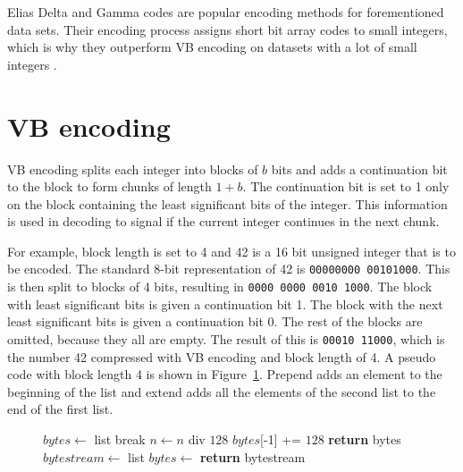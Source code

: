 Elias Delta and Gamma codes \citep{Eli75} are popular encoding methods for forementioned data sets. Their encoding process assigns short bit array codes to small integers, 
which is why they outperform VB encoding on datasets with a lot of small integers .

\section{VB encoding}
VB encoding splits each integer into blocks of $b$ bits and adds a continuation bit to the block to form chunks of length $1+b$. The continuation bit is set to 1 only
on the block containing the least significant bits of the integer. This information is used in decoding to signal if the current integer continues in the next chunk. 

For example, block length is set to 4 and 42 is a 16 bit unsigned integer that is to be encoded. The standard 8-bit representation of 42 is 
\texttt{00000000 00101000}. This is then split to blocks of 4 bits, resulting in \texttt{0000 0000 0010 1000}. The block with least significant bits is given a continuation bit 1.
The block with the next least significant bits is given a continuation bit 0. The rest of the blocks are omitted, because they all are empty. The result of this is \texttt{00010 11000}, 
which is the number 42 compressed with VB encoding and block length of 4. A pseudo code with block length 4 is shown in Figure~\ref{vbyte_enc}. Prepend adds an element to the beginning of the list 
and extend adds all the elements of the second list to the end of the first list.

\begin{figure}[ht]
\centering
  \begin{minipage}{0.5\linewidth}
\begin{algorithmic}[H]
\State $bytes\gets $ list
\State {}
 \State break \EndIf
\State $n\gets n$ div $128$
\EndWhile
\State $bytes$[-1] += $128$
\State \textbf{return} bytes
\EndFunction
\medskip
\medskip
{}
\State $bytestream\gets $ list
\State $bytes \gets$ 
\State {}
\EndFor
\State \textbf{return} bytestream
\EndFunction

\end{algorithmic}
\end{minipage}
 \label{vbyte_enc}
\end{figure}

